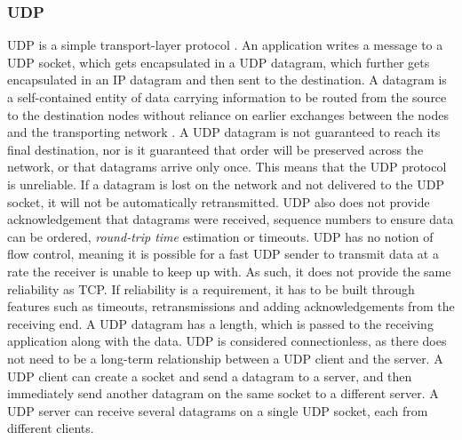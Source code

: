 \subsubsection{UDP}
UDP is a simple transport-layer protocol \cite{socketnetworking}.
An application writes a message to a UDP socket, which gets encapsulated in a UDP datagram, which further gets encapsulated in an IP datagram and then sent to the destination.
A datagram is a self-contained entity of data carrying information to be routed from the source to the destination nodes without reliance on earlier exchanges between the nodes and the transporting network \cite{hpbrowsernetwork}.
A UDP datagram is not guaranteed to reach its final destination, nor is it guaranteed that order will be preserved across the network, or that datagrams arrive only once.
This means that the UDP protocol is unreliable.
If a datagram is lost on the network and not delivered to the UDP socket, it will not be automatically retransmitted.
UDP also does not provide acknowledgement that datagrams were received, sequence numbers to ensure data can be ordered, \textit{round-trip time} estimation or timeouts.
UDP has no notion of flow control, meaning it is possible for a fast UDP sender to transmit data at a rate the receiver is unable to keep up with.
As such, it does not provide the same reliability as TCP.
If reliability is a requirement, it has to be built through features such as timeouts, retransmissions and adding acknowledgements from the receiving end.
A UDP datagram has a length, which is passed to the receiving application along with the data.
UDP is considered connectionless, as there does not need to be a long-term relationship between a UDP client and the server.
A UDP client can create a socket and send a datagram to a server, and then immediately send another datagram on the same socket to a different server.
A UDP server can receive several datagrams on a single UDP socket, each from different clients.


